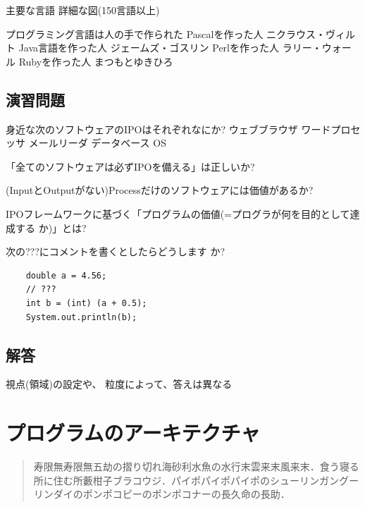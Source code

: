 \documentclass[a4j, twoside]{jsbook}
\begin{document}
 主要な言語
 詳細な図(150言語以上)

プログラミング言語は人の手で作られた
 Pascalを作った人
 ニクラウス・ヴィルト
 Java言語を作った人
 ジェームズ・ゴスリン
 Perlを作った人
 ラリー・ウォール
 Rubyを作った人
 まつもとゆきひろ
\section{演習問題}
\begin{演習}
身近な次のソフトウェアのIPOはそれぞれなにか?
 ウェブブラウザ
 ワードプロセッサ
 メールリーダ
 データベース
 OS 
\end{演習}

\begin{演習}
「全てのソフトウェアは必ずIPOを備える」は正しいか?
\end{演習}

\begin{演習}
(InputとOutputがない)Processだけのソフトウェアには価値があるか?
\end{演習}

\begin{演習}
IPOフレームワークに基づく「プログラムの価値(=プログラが何を目的として達成する
か)」とは?
\end{演習}

\begin{演習}
 次の???にコメントを書くとしたらどうします
か?
\begin{verbatim}
	double a = 4.56;
	// ???
	int b = (int) (a + 0.5);
	System.out.println(b);
\end{verbatim}
\end{演習}
\section{解答}
\begin{解答}
 視点(領域)の設定や、
粒度によって、答えは異なる
\end{解答}

\chapter{プログラムのアーキテクチャ}

\begin{abstract}
寿限無寿限無五劫の摺り切れ海砂利水魚の水行末雲来末風来末．食う寝る所に住む所藪柑子ブラコウジ．パイポパイポパイポのシューリンガングーリンダイのポンポコピーのポンポコナーの長久命の長助．
\end{abstract}
\end{document}
